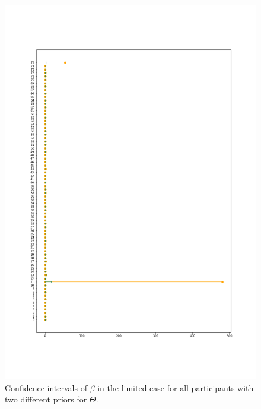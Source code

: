 \begin{figure}
    \centering
    \includegraphics[scale=0.37]{pictures/Sensitivity/ci_lim_beta.png}
    \caption[CIs for $\beta$ in the limited case]{Confidence intervals of $\beta$ in the limited case for all participants with two different priors for $\Theta$.}
    \label{fig:sensitivity_ci_lim_beta}
\end{figure}

